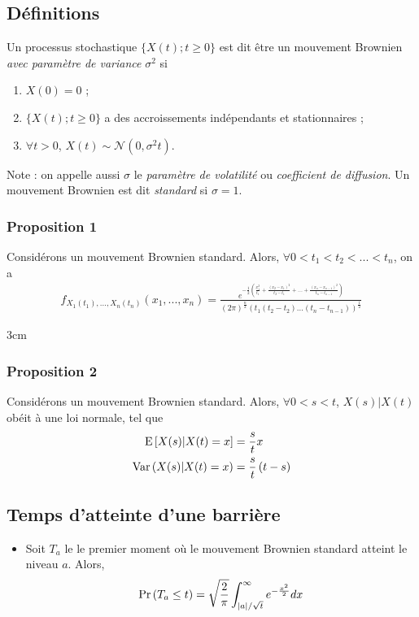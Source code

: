 \documentclass[10pt, french, landscape]{article}
\begin{document}
\begin{multicols*}{2}
\subsection*{Définitions}
\begin{definition}
Un processus stochastique $\{ X(t) ; t \geq 0 \}$ est dit être un mouvement Brownien \emph{avec paramètre de variance} $\sigma^2$ si
\begin{enumerate}[label=(\arabic*)]
\item $X(0) = 0$ ;
\item $\{ X(t) ; t \geq 0 \}$  a des accroissements indépendants et stationnaires ;
\item $\forall t > 0$, $X(t) \sim \mathcal{N}(0, \sigma^2 t)$.
\end{enumerate}
\end{definition}
Note : on appelle aussi $\sigma$ le \emph{paramètre de volatilité} ou \emph{coefficient de diffusion}. Un mouvement Brownien est dit \emph{standard} si $\sigma = 1$.

\subsubsection*{Proposition 1}
Considérons un mouvement Brownien standard. Alors, $\forall 0 < t_1 < t_2 < ... < t_{n}$, on a
\begin{align*}
f_{X_1(t_1), ..., X_n(t_n)}(x_1, ..., x_n) = \frac{e^{-\frac{1}{2} \left(\frac{x_1^2}{t_1} + \frac{(x_2 - x_1)^2}{t_2 - t_1} + ... + \frac{(x_n - x_{n-1})^2}{t_n - t_{n-1}} \right)}}{(2 \pi)^{\frac{n}{2}} (t_1 (t_2 - t_2) ... (t_n - t_{n-1}))^{\frac{1}{2}}} 
\end{align*}

\vfill{3cm}

\subsubsection*{Proposition 2}
Considérons un mouvement Brownien standard. Alors, $\forall 0 < s < t$, $X(s) | X(t)$ obéit à une loi normale, tel que
\begin{align*}
\mathrm{E} \left[ X(s) | X(t) = x \right]&  = \frac{s}{t} x \\
\mathrm{Var} \left( X(s) |X(t) = x \right) & = \frac{s}{t} \left( t - s \right) \\
\end{align*}

\subsection*{Temps d'atteinte d'une barrière}
\begin{itemize}
\item Soit $T_a$ le le premier moment où le mouvement Brownien standard atteint le niveau $a$. Alors,
\[\Pr \left( T_a \leq t \right) = \sqrt{\frac{2}{\pi}} \int_{|a| / \sqrt{t}}^{\infty} e^{- \frac{x^2}{2}} dx   \]


\end{itemize}
\end{multicols*}
\end{document}
